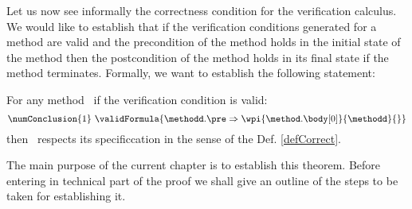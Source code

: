 Let us now see informally the correctness condition for the verification calculus. 
We would like to establish that if the verification conditions
generated for a method 
are valid 
and the precondition of the method holds in the initial state of the method 
then the postcondition of  the method holds in its final state if the method terminates.
Formally, we want to establish the following statement:

\begin{vcGenCorrect}\label{vcGenCorrect}
For any  method \methodd \  if the verification condition is valid:
$$ \numConclusion{1} \ \validFormula{\methodd.\pre \Rightarrow \wpi{\method.\body[0]}{\methodd}{}} $$
 then \methodd \ respects its specificcation in the sense of the Def. \ref{defCorrect}. 
\end{vcGenCorrect}

The main purpose of the current chapter is to establish this theorem. Before entering in technical part of the proof
we shall give an outline of the steps to be taken for establishing it.
